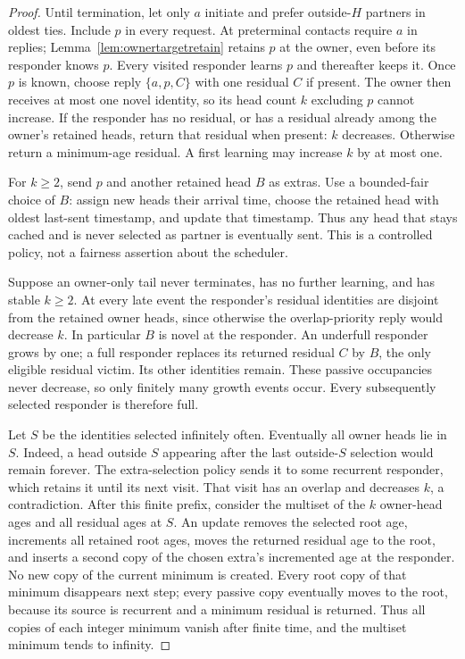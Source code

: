 \documentclass[11pt]{article}
\begin{document}
\begin{proof}
Until termination, let only $a$ initiate and prefer outside-$H$
partners in oldest ties. Include $p$ in every request. At
preterminal contacts require $a$ in replies; Lemma~\ref{lem:ownertargetretain} retains $p$
at the owner, even before its responder knows $p$. Every
visited responder learns $p$ and thereafter keeps it. Once
$p$ is known, choose reply $\{a,p,C\}$ with one residual $C$
if present. The owner then receives at most one novel identity,
so its head count $k$ excluding $p$ cannot increase.
If the responder has no residual, or has a residual already
among the owner's retained heads, return that residual when
present: $k$ decreases. Otherwise return a minimum-age residual.
A first learning may increase $k$ by at most one.

For $k\ge2$, send $p$ and another retained head $B$ as extras.
Use a bounded-fair choice of $B$: assign new heads their arrival
time, choose the retained head with oldest last-sent timestamp,
and update that timestamp. Thus any head that stays cached and
is never selected as partner is eventually sent. This is a
controlled policy, not a fairness assertion about the scheduler.

Suppose an owner-only tail never terminates, has no further
learning, and has stable $k\ge2$. At every late event the
responder's residual identities are disjoint from the retained
owner heads, since otherwise the overlap-priority reply would
decrease $k$. In particular $B$ is novel at the responder.
An underfull responder grows by one; a full responder replaces
its returned residual $C$ by $B$, the only eligible residual
victim. Its other identities remain. These passive occupancies
never decrease, so only finitely many growth events occur.
Every subsequently selected responder is therefore full.

Let $S$ be the identities selected infinitely often. Eventually
all owner heads lie in $S$. Indeed, a head outside $S$ appearing
after the last outside-$S$ selection would remain forever.
The extra-selection policy sends it to some recurrent responder,
which retains it until its next visit. That visit has an overlap
and decreases $k$, a contradiction. After this finite prefix,
consider the multiset of the $k$ owner-head ages and all residual
ages at $S$. An update removes the selected root age, increments
all retained root ages, moves the returned residual age to the
root, and inserts a second copy of the chosen extra's incremented
age at the responder. No new copy of the current minimum is
created. Every root copy of that minimum disappears next step;
every passive copy eventually moves to the root, because its
source is recurrent and a minimum residual is returned. Thus
all copies of each integer minimum vanish after finite time,
and the multiset minimum tends to infinity.


\end{proof}
\end{document}
